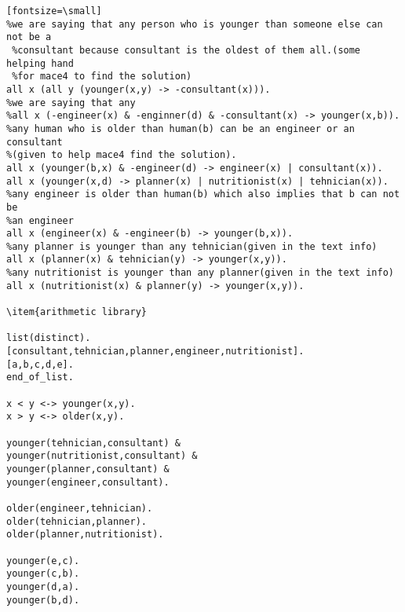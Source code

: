 \begin{verbatim}[fontsize=\small]
%we are saying that any person who is younger than someone else can not be a
 %consultant because consultant is the oldest of them all.(some helping hand
 %for mace4 to find the solution)
all x (all y (younger(x,y) -> -consultant(x))).
%we are saying that any 
%all x (-engineer(x) & -enginner(d) & -consultant(x) -> younger(x,b)).
%any human who is older than human(b) can be an engineer or an consultant
%(given to help mace4 find the solution).
all x (younger(b,x) & -engineer(d) -> engineer(x) | consultant(x)).
all x (younger(x,d) -> planner(x) | nutritionist(x) | tehnician(x)).
%any engineer is older than human(b) which also implies that b can not be 
%an engineer 
all x (engineer(x) & -engineer(b) -> younger(b,x)).
%any planner is younger than any tehnician(given in the text info)
all x (planner(x) & tehnician(y) -> younger(x,y)).
%any nutritionist is younger than any planner(given in the text info)
all x (nutritionist(x) & planner(y) -> younger(x,y)).

\item{arithmetic library}

list(distinct).
[consultant,tehnician,planner,engineer,nutritionist].
[a,b,c,d,e].
end_of_list.

x < y <-> younger(x,y).
x > y <-> older(x,y).

younger(tehnician,consultant) & 
younger(nutritionist,consultant) &
younger(planner,consultant) & 
younger(engineer,consultant).

older(engineer,tehnician).
older(tehnician,planner).
older(planner,nutritionist).

younger(e,c).
younger(c,b).
younger(d,a).
younger(b,d).

\end{verbatim}


